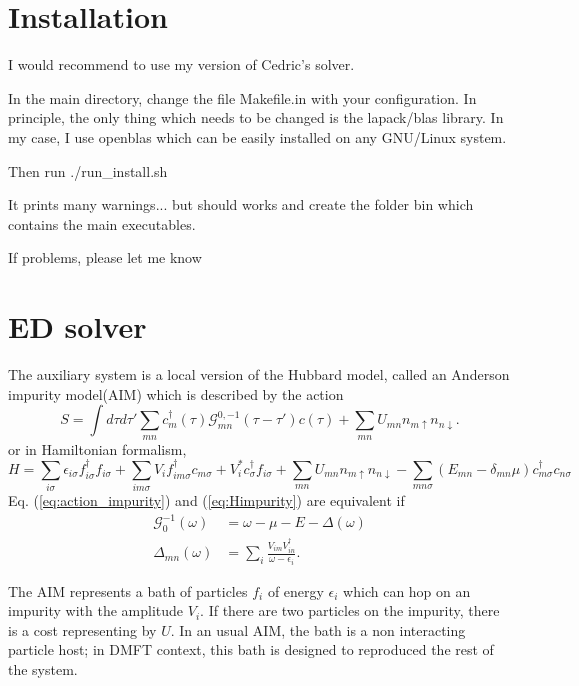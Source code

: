 \documentclass{book}
\def\D{\Delta}
\def\d{\delta}
\def\e{\epsilon}
\def\s{\sigma}
\def\t{\tau}
\def\w{\omega}
\def\dd{\dagger}
\def\ua{\uparrow}
\def\da{\downarrow}
\begin{document}
\section{Installation}

I would recommend to use my version of Cedric's solver.

In the main directory, change the file Makefile.in with your configuration. In principle, the only thing which needs to be changed is the lapack/blas library. In my case, I use openblas which can be easily installed on any GNU/Linux system.

Then run ./run\_install.sh

It prints many warnings... but should works and create the folder bin which contains the main executables.

If problems, please let me know


\section{ED solver}


The auxiliary system is a local version of the Hubbard model, called  an Anderson impurity model(AIM) which is described by the action
\begin{equation}
  \label{eq:action_impurity}
  S=\int d \t d\t' \sum_{mn} c_{m}^{\dd}(\t)\mathcal{G}_{mn}^{0,-1}(\t-\t')c(\t) +\sum_{mn}U_{mn} n_{m\ua}n_{n\da}.
\end{equation}
or in Hamiltonian formalism,
\begin{equation}
  H =  \sum_{i \s} \e_{i \s} f^{\dd}_{i \s} f_{i \s} + \sum_{im\s}V_i f_{im\s}^{\dd} c_{m\s} + V^*_i  c^{\dd}_{\s}f_{i\s}  +\sum_{mn}U_{mn} n_{m\ua}n_{n\da} -\sum_{mn\s}(E_{mn}-\d_{mn} \mu) c^{\dd}_{m\s}c_{n\s}
    \label{eq:Himpurity}
\end{equation}
Eq. (\ref{eq:action_impurity}) and (\ref{eq:Himpurity}) are equivalent if
\begin{align}
  \mathcal{G}_0^{-1}(\w) &= \w - \mu - E -\D(\w) \\
  \D_{mn}(\w) &= \sum_i \frac{V_{im} V^{\dd}_{in}}{\w-\e_i} .
           \label{eq:def-hybridization}
\end{align}

The AIM represents a bath of  particles $f_i$ of energy $\e_i$ which can hop on an impurity with the amplitude $V_i$. If there are two particles on the impurity, there is a cost representing by $U$.  In an usual AIM, the bath is a non interacting particle host;  in DMFT context, this bath is  designed to reproduced the rest of the system.
\end{document}
